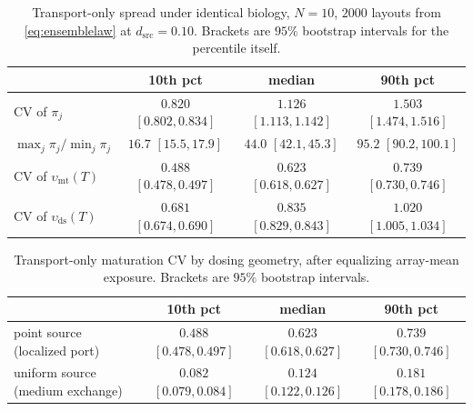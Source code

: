 \documentclass[pdflatex,sn-mathphys-num]{sn-jnl}
\numberwithin{equation}{section}
\theoremstyle{thmstyleone}%
\theoremstyle{definition}
\theoremstyle{remark}
\begin{document}
\begin{table}[htbp]\centering\small
\caption{Transport-only spread under identical biology, $N=10$, $2000$ layouts
from \eqref{eq:ensemblelaw} at $d_{\mathrm{src}}=0.10$. Brackets are $95\%$
bootstrap intervals for the percentile itself.}
\label{tab:null}
\begin{tabular}{@{}lccc@{}}
\toprule
&10th pct&median&90th pct\\
\midrule
$\mathrm{CV}$ of $\pi_j$&$0.820$ \tiny$[0.802,0.834]$&$1.126$ \tiny$[1.113,1.142]$&$1.503$ \tiny$[1.474,1.516]$\\
$\max_j\pi_j/\min_j\pi_j$&$16.7$ \tiny$[15.5,17.9]$&$44.0$ \tiny$[42.1,45.3]$&$95.2$ \tiny$[90.2,100.1]$\\
$\mathrm{CV}$ of $\upsilon_{\mathrm{mt}}(T)$&$0.488$ \tiny$[0.478,0.497]$&$\mathbf{0.623}$ \tiny$[0.618,0.627]$&$0.739$ \tiny$[0.730,0.746]$\\
$\mathrm{CV}$ of $\upsilon_{\mathrm{ds}}(T)$&$0.681$ \tiny$[0.674,0.690]$&$\mathbf{0.835}$ \tiny$[0.829,0.843]$&$1.020$ \tiny$[1.005,1.034]$\\
\bottomrule
\end{tabular}
\end{table}

\begin{table}[htbp]\centering\small
\caption{Transport-only maturation CV by dosing geometry, after equalizing
array-mean exposure. Brackets are $95\%$ bootstrap intervals.}
\label{tab:dosing}
\begin{tabular}{@{}lccc@{}}
\toprule
&10th pct&median&90th pct\\
\midrule
point source (localized port)&$0.488$ \tiny$[0.478,0.497]$&$0.623$ \tiny$[0.618,0.627]$&$0.739$ \tiny$[0.730,0.746]$\\
uniform source (medium exchange)&$0.082$ \tiny$[0.079,0.084]$&$\mathbf{0.124}$ \tiny$[0.122,0.126]$&$0.181$ \tiny$[0.178,0.186]$\\
\bottomrule
\end{tabular}
\end{table}
\end{document}

